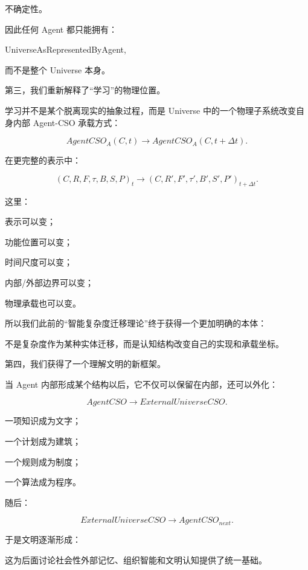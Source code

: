 不确定性。

因此任何 Agent 都只能拥有：

\begin{statementbox}
UniverseAsRepresentedByAgent,
\end{statementbox}

而不是整个 Universe 本身。

第三，我们重新解释了“学习”的物理位置。

学习并不是某个脱离现实的抽象过程，而是 Universe 中的一个物理子系统改变自身内部 Agent-CSO 承载方式：

\[
AgentCSO_A(C,t)
\rightarrow
AgentCSO_A(C,t+\Delta t).
\]

在更完整的表示中：

\[
(C,R,F,\tau,B,S,P)_t
\rightarrow
(C,R',F',\tau',B',S',P')_{t+\Delta t}.
\]

这里：

表示可以变；

功能位置可以变；

时间尺度可以变；

内部/外部边界可以变；

物理承载也可以变。

所以我们此前的“智能复杂度迁移理论”终于获得一个更加明确的本体：

\begin{statementbox}
不是复杂度作为某种实体迁移，而是认知结构改变自己的实现和承载坐标。
\end{statementbox}

第四，我们获得了一个理解文明的新框架。

当 Agent 内部形成某个结构以后，它不仅可以保留在内部，还可以外化：

\[
AgentCSO
\rightarrow
ExternalUniverseCSO.
\]

一项知识成为文字；

一个计划成为建筑；

一个规则成为制度；

一个算法成为程序。

随后：

\[
ExternalUniverseCSO
\rightarrow
AgentCSO_{next}.
\]

于是文明逐渐形成：

\begin{statementbox}
\centering
{}
\end{statementbox}

这为后面讨论社会性外部记忆、组织智能和文明认知提供了统一基础。

